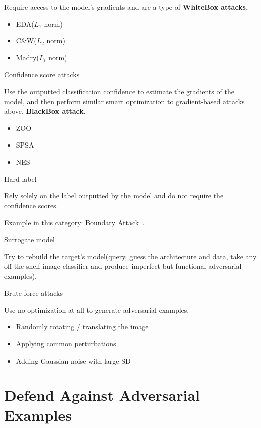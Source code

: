 \documentclass[11pt]{article}
\numberwithin{equation}{section}
\begin{document}
Require access to the model's gradients and are a type of\textbf{ WhiteBox attacks.}

\begin{itemize}
    \item EDA($L_1$ norm)~\cite{chen2018ead}
    \item C\&W($L_2$ norm)~\cite{carlini2017adversarial}
    \item Madry($L_i$ norm)~\cite{madry2017towards}
\end{itemize}

\colorbox{orange!15}{Confidence score attacks}

Use the outputted classification confidence to estimate the gradients of the model, and then perform similar smart optimization to gradient-based attacks above.\textbf{ BlackBox attack}.

\begin{itemize}
    \item ZOO~\cite{chen2017zoo}
    \item SPSA~\cite{uesato2018adversarial}
    \item NES~\cite{ilyas2018black}
\end{itemize}

\colorbox{orange!15}{Hard label}

Rely solely on the label outputted by the model and do not require the confidence scores.

Example in this category: Boundary Attack~\cite{brendel2017decision}.


\colorbox{orange!15}{Surrogate model}

Try to rebuild the target's model(query, guess the architecture and data, take any off-the-shelf image classifier and produce imperfect but functional adversarial examples).

\colorbox{orange!15}{Brute-force attacks}

Use no optimization at all to generate adversarial examples.

\begin{itemize}
    \item Randomly rotating / translating the image~\cite{engstrom2019exploring}
    \item Applying common perturbations~\cite{hendrycks2018benchmarking}
    \item Adding Gaussian noise with large SD~\cite{ford2019adversarial}
\end{itemize}

\section{Defend Against Adversarial Examples}
\end{document}
